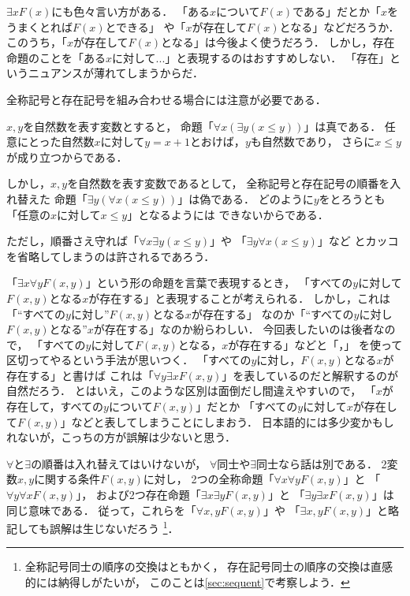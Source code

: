   $\exists x F(x)$にも色々言い方がある．
  「ある$x$について$F(x)$である」だとか「$x$をうまくとれば$F(x)$とできる」
  や「$x$が存在して$F(x)$となる」などだろうか．
  このうち，「$x$が存在して$F(x)$となる」は今後よく使うだろう．
  しかし，存在命題のことを「ある$x$に対して...」と表現するのはおすすめしない．
  「存在」というニュアンスが薄れてしまうからだ．

  全称記号と存在記号を組み合わせる場合には注意が必要である．
  \begin{ex}
    $x,  y$を自然数を表す変数とすると，
    命題「$\forall x ( \exists y ( x \leq y ))$」は真である．
    任意にとった自然数$x$に対して$y=x+1$とおけば，$y$も自然数であり，
    さらに$x \leq y$が成り立つからである．

    しかし，$x,  y$を自然数を表す変数であるとして，
    全称記号と存在記号の順番を入れ替えた
    命題「$\exists y ( \forall x ( x \leq y))$」は偽である．
    どのように$y$をとろうとも「任意の$x$に対して$x \leq y$」となるようには
    できないからである．

    ただし，順番さえ守れば「$\forall x \exists y ( x \leq y) $」や
    「$\exists y \forall x ( x \leq y )$」など
    とカッコを省略してしまうのは許されるであろう．
  \end{ex}
  
  「$\exists x \forall y F(x, y)$」という形の命題を言葉で表現するとき，
  「すべての$y$に対して$F(x, y)$となる$x$が存在する」と表現することが考えられる．
  しかし，これは「``すべての$y$に対し''$F(x, y)$となる$x$が存在する」
  なのか「``すべての$y$に対し$F(x,y)$となる''$x$が存在する」なのか紛らわしい．
  今回表したいのは後者なので，
  「すべての$y$に対して$F(x,y)$となる，$x$が存在する」などと「，」
  を使って区切ってやるという手法が思いつく．
  「すべての$y$に対し，$F(x,y)$となる$x$が存在する」と書けば
  これは「$\forall y \exists x F(x,y)$」を表しているのだと解釈するのが自然だろう．
  とはいえ，このような区別は面倒だし間違えやすいので，
  「$x$が存在して，すべての$y$について$F(x,y)$」だとか
  「すべての$y$に対して$x$が存在して$F(x,y)$」などと表してしまうことにしまおう．
  日本語的には多少変かもしれないが，こっちの方が誤解は少ないと思う．

  $\forall$と$\exists$の順番は入れ替えてはいけないが，
  $\forall$同士や$\exists$同士なら話は別である．
  2変数$x,  y$に関する条件$F(x, y)$に対し，
  2つの全称命題「$\forall x \forall y F(x, y)$」と
  「$\forall y \forall x F(x, y)$」，
  および2つ存在命題「$\exists x \exists y F(x, y)$」と
  「$\exists y \exists x F(x, y)$」は同じ意味である．
  従って，これらを「$\forall x, y F(x, y)$」や
  「$\exists x, y F(x, y)$」と略記しても誤解は生じないだろう
  \footnote{全称記号同士の順序の交換はともかく，
  存在記号同士の順序の交換は直感的には納得しがたいが，
このことは\ref{sec:sequent}で考察しよう．}．
  
